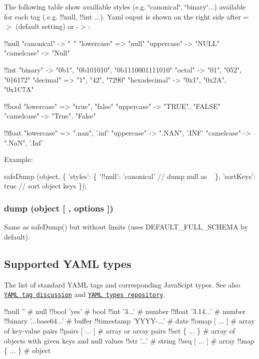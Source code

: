 The following table show availlable styles (e.\+g. \char`\"{}canonical\char`\"{}, \char`\"{}binary\char`\"{}...) available for each tag (.e.\+g. !!null, !!int ...). Yaml ouput is shown on the right side after {\ttfamily =$>$} (default setting) or {\ttfamily -\/$>$}\+:


\begin{DoxyCode}
!!null
  "canonical"   -> "~"
  "lowercase"   => "null"
  "uppercase"   -> "NULL"
  "camelcase"   -> "Null"

!!int
  "binary"      -> "0b1", "0b101010", "0b1110001111010"
  "octal"       -> "01", "052", "016172"
  "decimal"     => "1", "42", "7290"
  "hexadecimal" -> "0x1", "0x2A", "0x1C7A"

!!bool
  "lowercase"   => "true", "false"
  "uppercase"   -> "TRUE", "FALSE"
  "camelcase"   -> "True", "False"

!!float
  "lowercase"   => ".nan", '.inf'
  "uppercase"   -> ".NAN", '.INF'
  "camelcase"   -> ".NaN", '.Inf'
\end{DoxyCode}


Example\+:


\begin{DoxyCode}
safeDump (object, \{
  'styles': \{
    '!!null': 'canonical' // dump null as ~
  \},
  'sortKeys': true        // sort object keys
\});
\end{DoxyCode}


\subsubsection*{dump (object \mbox{[} , options \mbox{]})}

Same as {\ttfamily safe\+Dump()} but without limits (uses {\ttfamily D\+E\+F\+A\+U\+L\+T\+\_\+\+F\+U\+L\+L\+\_\+\+S\+C\+H\+E\+MA} by default).

\subsection*{Supported Y\+A\+ML types }

The list of standard Y\+A\+ML tags and corresponding Java\+Scipt types. See also \href{http://pyyaml.org/wiki/YAMLTagDiscussion}{\tt Y\+A\+ML tag discussion} and \href{http://yaml.org/type/}{\tt Y\+A\+ML types repository}.


\begin{DoxyCode}
!!null ''                   # null
!!bool 'yes'                # bool
!!int '3...'                # number
!!float '3.14...'           # number
!!binary '...base64...'     # buffer
!!timestamp 'YYYY-...'      # date
!!omap [ ... ]              # array of key-value pairs
!!pairs [ ... ]             # array or array pairs
!!set \{ ... \}               # array of objects with given keys and null values
!!str '...'                 # string
!!seq [ ... ]               # array
!!map \{ ... \}               # object
\end{DoxyCode}


